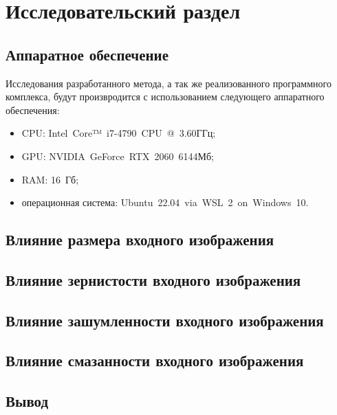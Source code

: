 \chapter{Исследовательский раздел}

\section{Аппаратное обеспечение}

Исследования разработанного метода, а так же реализованного программного комплекса, будут произвродится с использованием следующего аппаратного обеспечения:
\begin{itemize}[label=---]
    \item CPU: Intel~Core™~i7-4790~CPU~@~3.60ГГц;
    \item GPU: NVIDIA~GeForce~RTX~2060~6144Мб;
    \item RAM: 16~Гб;
    \item операционная система: Ubuntu~22.04~via~WSL~2~on~Windows~10.
\end{itemize}
            
\section{Влияние размера входного изображения}

\section{Влияние зернистости входного изображения}

\section{Влияние зашумленности входного изображения}

\section{Влияние смазанности входного изображения}

\section{Вывод}